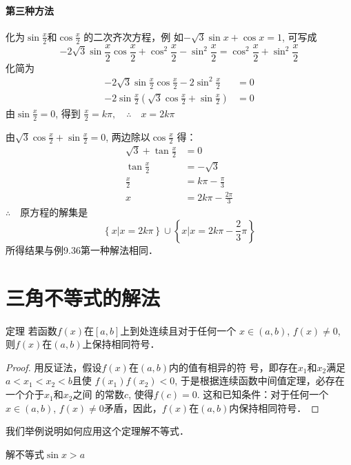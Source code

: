 \paragraph{第三种方法} 化为$\sin\frac{x}{2}$和$\cos \frac{x}{2}$
的二次齐次方程，例
如$-\sqrt{3}\sin x+\cos x=1$, 可写成
\[-2\sqrt{3}\sin\frac{x}{2}\cos \frac{x}{2}+\cos^2\frac{x}{2}-\sin^2\frac{x}{2}=\cos^2\frac{x}{2}+\sin^2\frac{x}{2}\]
化简为
\[\begin{split}
    -2\sqrt{3}\sin\frac{x}{2}\cos\frac{x}{2}-2\sin^2\frac{x}{2}&=0\\
    -2\sin\frac{x}{2}\left(\sqrt{3}\cos\frac{x}{2}+\sin\frac{x}{2}\right)&=0
\end{split}\]
由$\sin\frac{x}{2}=0$, 得到
$\frac{x}{2}=k\pi ,\quad \therefore\quad x=2k\pi $

由$\sqrt{3}\cos\frac{x}{2}+\sin \frac{x}{2}=0$, 两边除以$\cos\frac{x}{2}$
得：
\[\begin{split}
    \sqrt{3}+\tan\frac{x}{2} &=0\\
    \tan\frac{x}{2}&=-\sqrt{3}\\
    \frac{x}{2}&=k\pi-\frac{\pi}{3}\\
    x&=2k\pi-\frac{2\pi}{3}
\end{split}\]
$\therefore\quad $原方程的解集是
\[\left\{x\big|x=2k\pi\right\}\cup \left\{x\big|x=2k\pi-\frac{2}{3}\pi\right\}\]
所得结果与例9.36第一种解法相同．

\section{三角不等式的解法}
\begin{blk}{定理}
    若函数$f(x)$在$[a,b]$上到处连续且对于任何一个
$x\in (a,b)$, $f(x)\ne 0$, 则$f(x)$在$(a,b)$上保持相同符号．
\end{blk}

\begin{proof}
    用反证法，假设$f(x)$在$(a,b)$内的值有相异的符
号，即存在$x_1$和$x_2$满足$a<x_1<x_2<b$且使
$f(x_1)f(x_2)<0$,
于是根据连续函数中间值定理，必存在一个介于$x_1$和$x_2$之间
的常数$c$, 使得$f(c)=0$. 这和已知条件：对于任何一个$x\in
(a,b)$, $f(x)\ne 0$矛盾，因此，$f(x)$在$(a,b)$内保持相同符号．
\end{proof}

我们举例说明如何应用这个定理解不等式．


\begin{example}
    解不等式$\sin x>a$
\end{example}

